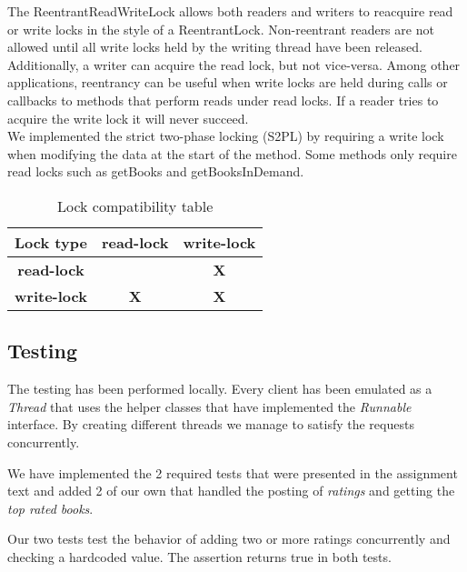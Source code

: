 \documentclass{article}      %
\begin{document}
The ReentrantReadWriteLock allows both readers and writers to reacquire read or write locks in the style of a ReentrantLock. Non-reentrant readers are not allowed until all write locks held by the writing thread have been released. Additionally, a writer can acquire the read lock, but not vice-versa. Among other applications, reentrancy can be useful when write locks are held during calls or callbacks to methods that perform reads under read locks. If a reader tries to acquire the write lock it will never succeed.\\

We implemented the strict two-phase locking (S2PL) by requiring a write lock when modifying the data at the start of the method. Some methods only require read locks such as getBooks and getBooksInDemand.\\

\begin{table}[h]
\begin{center}
\begin{tabular}{|c|c|c|}
\hline
{\bf{Lock type}} & \bf{read-lock} & \bf{write-lock} \\ \hline
\bf{read-lock} & \multicolumn{1}{l|}{} & \bf{X} \\ \hline
\bf{write-lock} & \bf{X} & \bf{X} \\ \hline
\end{tabular}
\caption{Lock compatibility table}
\label{Lock compatibility table}
\end{center}
\end{table}

\subsection*{Testing}

The testing has been performed locally. Every client has been emulated as a \emph{Thread} that uses the helper classes that have implemented the \emph{Runnable} interface. By creating different threads we manage to satisfy the requests concurrently.  

We have implemented the 2 required tests that were presented in the assignment text and added 2 of our own that handled the posting of \emph{ratings} and getting the \emph{top rated books}.

Our two tests test the behavior of adding two or more ratings concurrently and checking a hardcoded value. The assertion returns true in both tests.
\end{document}
